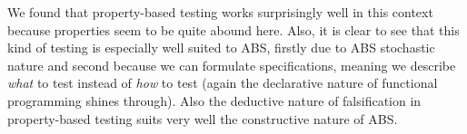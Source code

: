 We found that property-based testing works surprisingly well in this context because properties seem to be quite abound here. Also, it is clear to see that this kind of testing is especially well suited to ABS, firstly due to ABS stochastic nature and second because we can formulate specifications, meaning we describe \textit{what} to test instead of \textit{how} to test (again the declarative nature of functional programming shines through). Also the deductive nature of falsification in property-based testing suits very well the constructive nature of ABS.
